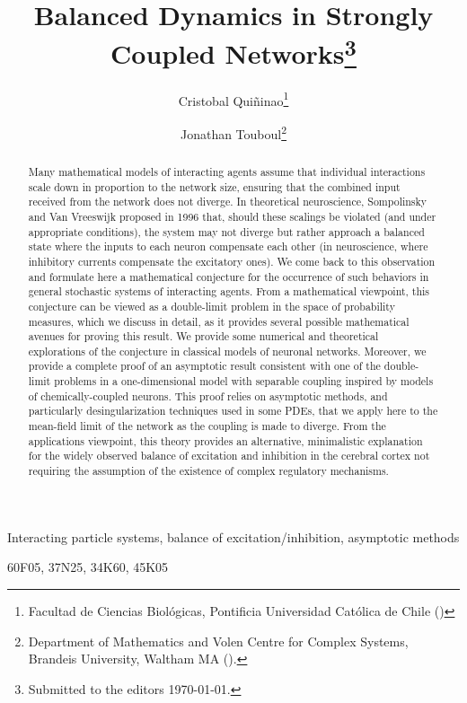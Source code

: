 \documentclass[onefignum,onetabnum]{siamart190516}
\title{Balanced Dynamics in Strongly Coupled Networks\thanks{Submitted to the editors \today.}}
\author{Cristobal Qui\~ninao\thanks{Facultad de Ciencias Biol\'ogicas, Pontificia Universidad Cat\'olica de Chile (\email{cquininao@uc.cl})}
\and Jonathan Touboul\thanks{Department of Mathematics and Volen Centre for Complex Systems, Brandeis University, Waltham MA 
  (\email{jtouboul@brandeis.edu}).}
   }
\newcommand{\1}{\mathbbm{1}}
\newcommand{\review}[1]{\textcolor{midblue}{ #1}}
\renewcommand{\review}[1]{{ #1}}
\begin{document}
\maketitle

\begin{abstract}
\review{Many mathematical models of interacting agents assume that individual interactions scale down in proportion to the network size, ensuring that the combined input received from the network does not diverge. In theoretical neuroscience, Sompolinsky and Van Vreeswijk proposed in 1996 that, should these scalings be violated (and under appropriate conditions), the system may not diverge but rather approach a balanced state where the inputs to each neuron compensate each other (in neuroscience, where inhibitory currents compensate the excitatory ones). We come back to this observation and formulate here a mathematical conjecture for the occurrence of such behaviors in general stochastic systems of interacting agents. From a mathematical viewpoint, this conjecture can be viewed as a double-limit problem in the space of probability measures, which we discuss in detail, as it provides several possible mathematical avenues for proving this result. We provide some numerical and theoretical explorations of the conjecture in classical models of neuronal networks. Moreover, we provide a complete proof of an asymptotic result consistent with one of the double-limit problems in a one-dimensional model with separable coupling inspired by models of chemically-coupled neurons. This proof relies on asymptotic methods, and particularly desingularization techniques used in some PDEs, that we apply here to the mean-field limit of the network as the coupling is made to diverge. From the applications viewpoint, this theory provides an alternative, minimalistic explanation for the widely observed balance of excitation and inhibition in the cerebral cortex not requiring the assumption of the existence of complex regulatory mechanisms. }
\end{abstract}

\begin{keywords}
Interacting particle systems, balance of excitation/inhibition, asymptotic methods
\end{keywords}
\begin{AMS}
60F05, 37N25, 34K60, 45K05 
\end{AMS}
\end{document}

